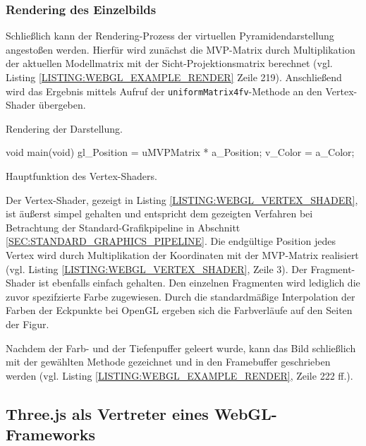 \subsubsection{Rendering des Einzelbilds}

Schließlich kann der Rendering-Prozess der virtuellen Pyramidendarstellung angestoßen werden. Hierfür wird zunächst die MVP-Matrix durch Multiplikation der aktuellen Modellmatrix mit der Sicht-Projektionsmatrix berechnet (vgl. Listing \ref{LISTING:WEBGL_EXAMPLE_RENDER} Zeile 219). Anschließend wird das Ergebnis mittels Aufruf der \texttt{uniformMatrix4fv}-Methode an den Vertex-Shader übergeben.

\smallskip
\begin{listing}[!htb]
\caption{Rendering der Darstellung.}
\label{LISTING:WEBGL_EXAMPLE_RENDER}
\end{listing}

\begin{listing}[!htb]
\begin{jscode}
void main(void) {
	gl_Position = uMVPMatrix * a_Position;
	v_Color = a_Color;
}
\end{jscode}
\caption{Hauptfunktion des Vertex-Shaders.}
\label{LISTING:WEBGL_VERTEX_SHADER}
\end{listing}

Der Vertex-Shader, gezeigt in Listing \ref{LISTING:WEBGL_VERTEX_SHADER}, ist äußerst simpel gehalten und entspricht dem gezeigten Verfahren bei Betrachtung der Standard-Grafikpipeline in Abschnitt \ref{SEC:STANDARD_GRAPHICS_PIPELINE}. Die endgültige Position jedes Vertex wird durch Multiplikation der Koordinaten mit der MVP-Matrix realisiert (vgl. Listing \ref{LISTING:WEBGL_VERTEX_SHADER}, Zeile 3). Der Fragment-Shader ist ebenfalls einfach gehalten. Den einzelnen Fragmenten wird lediglich die zuvor spezifzierte Farbe zugewiesen. Durch die standardmäßige Interpolation der Farben der Eckpunkte bei OpenGL ergeben sich die Farbverläufe auf den Seiten der Figur.

Nachdem der Farb- und der Tiefenpuffer geleert wurde, kann das Bild schließlich mit der gewählten Methode gezeichnet und in den Framebuffer geschrieben werden (vgl. Listing \ref{LISTING:WEBGL_EXAMPLE_RENDER}, Zeile 222 ff.).

\subsection{Three.js als Vertreter eines WebGL-Frameworks}

